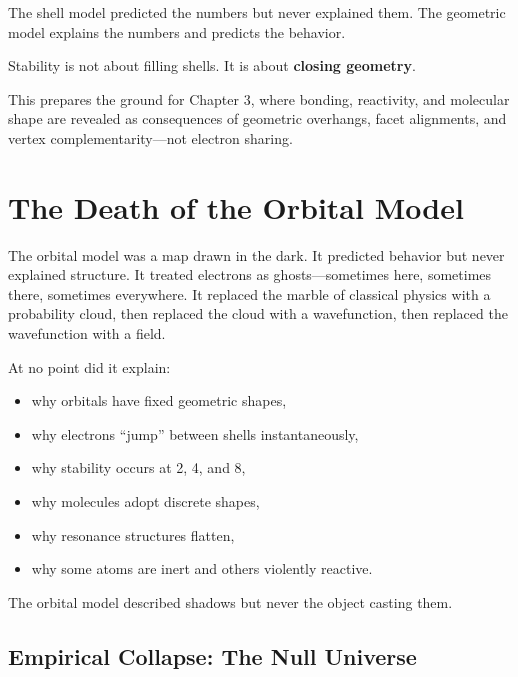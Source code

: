 \documentclass[11pt, letterpaper, openany]{book}
\begin{document}
The shell model predicted the numbers but never explained them.  
The geometric model explains the numbers and predicts the behavior.

\begin{tcolorbox}[colback=black!5,colframe=black,title=Geometric Interpretation]
Stability is not about filling shells.  
It is about \textbf{closing geometry}.
\end{tcolorbox}

This prepares the ground for Chapter 3, where bonding, reactivity, and molecular shape
are revealed as consequences of geometric overhangs, facet alignments, and vertex
complementarity—not electron sharing.


\section{The Death of the Orbital Model}

The orbital model was a map drawn in the dark. It predicted behavior but never explained
structure. It treated electrons as ghosts—sometimes here, sometimes there, sometimes
everywhere. It replaced the marble of classical physics with a probability cloud, then
replaced the cloud with a wavefunction, then replaced the wavefunction with a field.

At no point did it explain:

\begin{itemize}
    \item why orbitals have fixed geometric shapes,
    \item why electrons “jump” between shells instantaneously,
    \item why stability occurs at 2, 4, and 8,
    \item why molecules adopt discrete shapes,
    \item why resonance structures flatten,
    \item why some atoms are inert and others violently reactive.
\end{itemize}

The orbital model described shadows but never the object casting them.

\subsection*{Empirical Collapse: The Null Universe}
\end{document}

